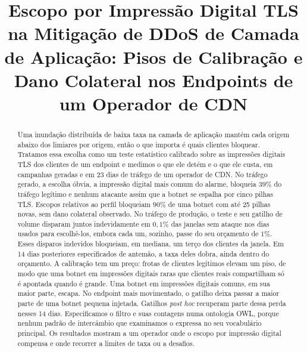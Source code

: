 \documentclass[conference,letterpaper,10pt]{IEEEtran}
\newcommand\1{\textit{(i)}}
\newcommand\2{\textit{(ii)}}
\newcommand\3{\textit{(iii)}}
\begin{document}
\renewcommand{\IEEEkeywordsname}{Palavras-chave}

\title{Escopo por Impressão Digital TLS na Mitigação de DDoS de Camada de Aplicação: Pisos de Calibração e Dano Colateral nos Endpoints de um Operador de CDN}

\author{
}

\maketitle

\begin{abstract}
Uma inundação distribuída de baixa taxa na camada de aplicação mantém cada origem abaixo dos limiares por origem, então o que importa é quais clientes bloquear. Tratamos essa escolha como um teste estatístico calibrado sobre as impressões digitais TLS dos clientes de um endpoint e medimos o que ele detém e o que ele custa, em campanhas geradas e em 23 dias de tráfego de um operador de CDN. No tráfego gerado, a escolha óbvia, a impressão digital mais comum do alarme, bloqueia $39\%$ do tráfego legítimo e nenhum atacante assim que a botnet se espalha por cinco pilhas TLS. Escopos relativos ao perfil bloqueiam $90\%$ de uma botnet com até 25 pilhas novas, sem dano colateral observado. No tráfego de produção, o teste e seu gatilho de volume disparam juntos indevidamente em $0{,}1\%$ das janelas sem ataque nos dias usados para escolhê-los, embora cada um, sozinho, passe do seu orçamento de $1\%$. Esses disparos indevidos bloqueiam, em mediana, um terço dos clientes da janela. Em 14 dias posteriores especificados de antemão, a taxa deles dobra, ainda dentro do orçamento. A calibração tem um preço: frotas de clientes legítimos elevam um piso, de modo que uma botnet em impressões digitais raras que clientes reais compartilham só é apontada quando é grande. Uma botnet em impressões digitais comuns, em sua maior parte, escapa. No endpoint mais movimentado, o gatilho deixa passar a maior parte de uma botnet pequena injetada. Gatilhos \textit{post hoc} recuperam parte dessa perda nesses 14 dias. Especificamos o filtro e suas contagens numa ontologia OWL, porque nenhum padrão de intercâmbio que examinamos o expressa no seu vocabulário principal. Os resultados mostram a um operador onde o escopo por impressão digital compensa e onde recorrer a limites de taxa ou a desafios.
\end{abstract}
\end{document}
